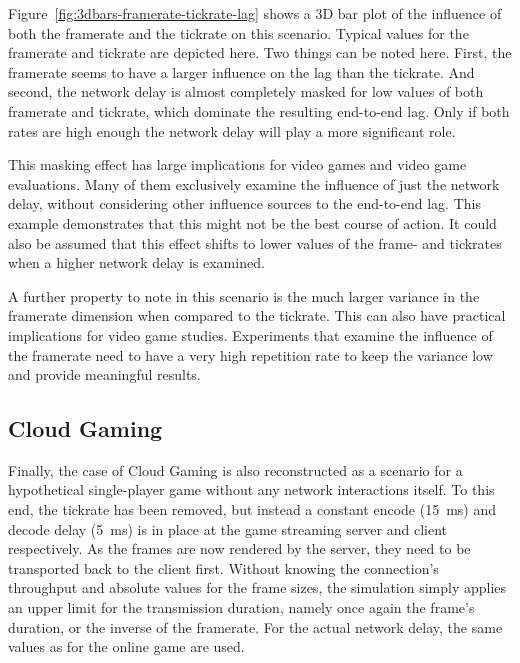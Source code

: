 Figure~\ref{fig:3dbars-framerate-tickrate-lag} shows a 3D bar plot of the influence of both the framerate and the tickrate on this scenario. Typical values for the framerate and tickrate are depicted here. Two things can be noted here. First, the framerate seems to have a larger influence on the lag than the tickrate. And second, the network delay is almost completely masked for low values of both framerate and tickrate, which dominate the resulting end-to-end lag. Only if both rates are high enough the network delay will play a more significant role.

This masking effect has large implications for video games and video game evaluations. Many of them exclusively examine the influence of just the network delay, without considering other influence sources to the end-to-end lag. This example demonstrates that this might not be the best course of action. It could also be assumed that this effect shifts to lower values of the frame- and tickrates when a higher network delay is examined.

A further property to note in this scenario is the much larger variance in the framerate dimension when compared to the tickrate. This can also have practical implications for video game studies. Experiments that examine the influence of the framerate need to have a very high repetition rate to keep the variance low and provide meaningful results.


\subsection{Cloud Gaming}

Finally, the case of Cloud Gaming is also reconstructed as a scenario for a hypothetical single-player game without any network interactions itself. To this end, the tickrate has been removed, but instead a constant encode (\SI{15}{\milli\second}) and decode delay (\SI{5}{\milli\second}) is in place at the game streaming server and client respectively. As the frames are now rendered by the server, they need to be transported back to the client first. 
Without knowing the connection's throughput and absolute values for the frame sizes, the simulation simply applies an upper limit for the transmission duration, namely once again the frame's duration, or the inverse of the framerate. For the actual network delay, the same values as for the online game are used.

